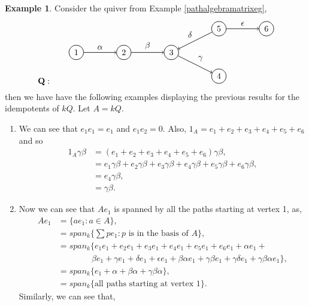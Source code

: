 \documentclass[11.5pt, twoside, a4paper, titlepage]{report}
\theoremstyle{definition}
\newtheorem{eg}[mydef]{Example}
\theoremstyle{plain}
\begin{document}
\begin{eg}
Consider the quiver from Example \ref{pathalgebramatrixeg}, 
\begin{equation*}
\mathbf{Q}: \qquad
\begin{tikzpicture}[->,-latex, auto, every path/.style={->, semithick}, main node/.style={draw, circle}]
\node	[main node]		(1) at (0,0)		{1};
\node [main node]		(2) at (2,0)		{2};
\node [main node]		(3) at (4,0)		{3};
\node [main node]		(4) at (6,-1)		{4};
\node [main node]		(5) at (6,1)		{5};
\node [main node]		(6) at (8, 1)		{6};

\draw (1) edge node [auto] {$\alpha$} (2);
\draw (2) edge node [auto] {$\beta$} (3);
\draw (3) edge node [auto] {$\gamma$} (4);
\draw (5) edge node [auto, swap] {$\delta$} (3);
\draw (5) edge node [auto] {$\epsilon$} (6);
\end{tikzpicture}
\end{equation*}
then we have have the following examples displaying the previous results for the idempotents of $kQ$. Let $A=kQ$.
\begin{enumerate}
\item We can see that $e_1e_1=e_1$ and $e_1e_2=0$. Also, $1_{A}=e_1 + e_2 + e_3 +e_4+e_5+e_6$ and so
\begin{align*}
1_A\gamma\beta&=(e_1 + e_2 + e_3 +e_4+e_5+e_6)\gamma\beta, \\
&=e_1\gamma\beta + e_2\gamma\beta + e_3\gamma\beta + e_4\gamma\beta + e_5\gamma\beta +e_6 \gamma\beta,\\
&=e_4\gamma\beta,\\
&=\gamma\beta.
\end{align*}
\item Now we can see that $Ae_1$ is spanned by all the paths starting at vertex 1, as,
\begin{align*}
Ae_1&=\{ae_1: a \in A\},\\
&=span_k\{\sum pe_1: p \text{ is in the basis of }A\},\\
&=span_k\{e_1e_1 + e_2e_1 + e_3e_1 +e_4e_1+e_5e_1+e_6e_1+\alpha e_1 + \\
&\qquad \qquad  \beta e_1 + \gamma e_1 + \delta e_1 +\epsilon e_1 +\beta\alpha e_1 + \gamma\beta e_1 + \gamma\delta e_1 + \gamma\beta\alpha e_1\}, \\
&=span_k\{e_1 + \alpha + \beta\alpha + \gamma\beta\alpha\}, \\
&=span_k\{\text{all paths starting at vertex 1}\}.
\end{align*}
Similarly, we can see that,
\begin{align*}

\end{align*}
\end{enumerate}
\end{eg}
\end{document}
